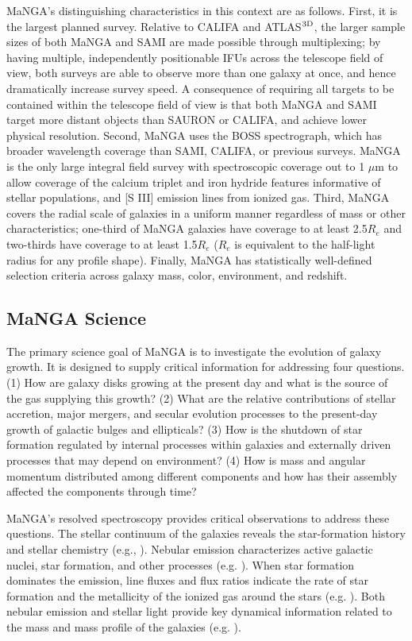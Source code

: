 MaNGA's distinguishing characteristics in this context are as
follows. First, it is the largest planned survey. Relative to CALIFA
and ATLAS$^{\rm 3D}$, the larger sample sizes of both MaNGA and SAMI
are made possible through multiplexing; by having multiple,
independently positionable IFUs across the telescope field of view,
both surveys are able to observe more than one galaxy at once, and
hence dramatically increase survey speed.  A consequence of requiring
all targets to be contained within the telescope field of view is that
both MaNGA and SAMI target more distant objects than SAURON or CALIFA,
and achieve lower physical resolution. Second, MaNGA uses the BOSS
spectrograph, which has broader wavelength coverage than SAMI, CALIFA,
or previous surveys. MaNGA is the only large integral field survey
with spectroscopic coverage out to 1 $\mu$m to allow coverage of the
calcium triplet and iron hydride features informative of stellar
populations, and [S III] emission lines from ionized gas. Third, MaNGA
covers the radial scale of galaxies in a uniform manner regardless of
mass or other characteristics; one-third of MaNGA galaxies have
coverage to at least 2.5$R_e$ and two-thirds have coverage to at least
1.5$R_e$ ($R_e$ is equivalent to the half-light radius for any profile
shape).  Finally, MaNGA has statistically well-defined selection
criteria across galaxy mass, color, environment, and redshift.

\subsection{MaNGA Science}

The primary science goal of MaNGA is to investigate the evolution of
galaxy growth. It is designed to supply critical information for
addressing four questions. (1) How are galaxy disks growing at the
present day and what is the source of the gas supplying this growth?
(2) What are the relative contributions of stellar accretion, major
mergers, and secular evolution processes to the present-day growth of
galactic bulges and ellipticals? (3) How is the shutdown of star
formation regulated by internal processes within galaxies and
externally driven processes that may depend on environment? (4) How is
mass and angular momentum distributed among different components and
how has their assembly affected the components through time?

MaNGA's resolved spectroscopy provides critical observations to
address these questions. The stellar continuum of the galaxies reveals
the star-formation history and stellar chemistry (e.g.,
\citealt{thomas03a}). Nebular emission characterizes active galactic
nuclei, star formation, and other processes
(e.g. \citealt{osterbrock06a}).  When star formation dominates the
emission, line fluxes and flux ratios indicate the rate of star
formation and the metallicity of the ionized gas around the stars
(e.g. \citealt{tremonti04a}). Both nebular emission and stellar light
provide key dynamical information related to the mass and mass profile
of the galaxies (e.g. \citealt{cappellari08a, li16a}).

